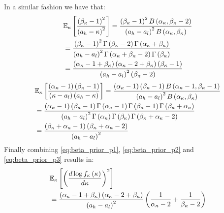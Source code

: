 In a similar fashion we have that:
\begin{align}\label{eq:beta_prior_p2}
    &\mathbb{E}_{\kappa}\left[\frac{\left(\beta_{\kappa}-1\right)^2}{\left(a_h-\kappa\right)^2}\right]=\frac{ \left(\beta_{\kappa}-1\right)^2B\left(\alpha_{\kappa},\beta_{\kappa}-2\right)}{\left(a_h-a_l\right)^{2} B\left(\alpha_{\kappa},\beta_{\kappa}\right)}\nonumber\\
    &=\frac{\left(\beta_{\kappa}-1\right)^2\Gamma\left(\beta_{\kappa}-2\right)\Gamma\left(\alpha_{\kappa}+\beta_{\kappa}\right)}{\left(a_h-a_l\right)^{2} \Gamma\left(\alpha_{\kappa}+\beta_{\kappa}-2\right) \Gamma\left(\beta_{\kappa}\right)}\nonumber\\
    &=\frac{ \left(\alpha_{\kappa}-1+\beta_{\kappa}\right)\left(\alpha_{\kappa}-2+\beta_{\kappa}\right)\left(\beta_{\kappa}-1\right)}{\left(a_h-a_l\right)^{2} \left(\beta_{\kappa}-2\right)}
\end{align}
\begin{align}\label{eq:beta_prior_p3}
    &\mathbb{E}_{\kappa}\left[\frac{\left(\alpha_{\kappa}-1\right)\left(\beta_{\kappa}-1\right)}{\left(\kappa-a_l\right)\left(a_h-\kappa\right)}\right]=\frac{ \left(\alpha_{\kappa}-1\right)\left(\beta_{\kappa}-1\right)B\left(\alpha_{\kappa}-1,\beta_{\kappa}-1\right)}{\left(a_h-a_l\right)^{2} B\left(\alpha_{\kappa},\beta_{\kappa}\right)}\nonumber\\
    &=\frac{\left(\alpha_{\kappa}-1\right)\left(\beta_{\kappa}-1\right)\Gamma\left(\alpha_{\kappa}-1\right)\Gamma\left(\beta_{\kappa}-1\right)\Gamma\left(\beta_{\kappa}+\alpha_{\kappa}\right)}{\left(a_h-a_l\right)^{2}\Gamma\left(\alpha_{\kappa}\right)\Gamma\left(\beta_{\kappa}\right)\Gamma\left(\beta_{\kappa}+\alpha_{\kappa}-2\right)}\nonumber\\
    &=\frac{\left(\beta_{\kappa}+\alpha_{\kappa}-1\right)\left(\beta_{\kappa}+\alpha_{\kappa}-2\right)}{\left(a_h-a_l\right)^{2}}
\end{align}
Finally combining \eqref{eq:beta_prior_p1}, \eqref{eq:beta_prior_p2} and \eqref{eq:beta_prior_p3}  results in:
\begin{align}\label{eq:beta_prior_fim}
&\mathbb{E}_{\kappa}\left[\left(\frac{d \log f_{\kappa}\left(\kappa\right)}{d\kappa}\right)^2\right]\nonumber \\
&=\frac{\left(\alpha_{\kappa}-1+\beta_{\kappa}\right)\left(\alpha_{\kappa}-2+\beta_{\kappa}\right)}{\left(a_h-a_l\right)^{2}}\left(\frac{1}{\alpha_{\kappa}-2}+\frac{1}{\beta_{\kappa}-2}\right)
\end{align}

